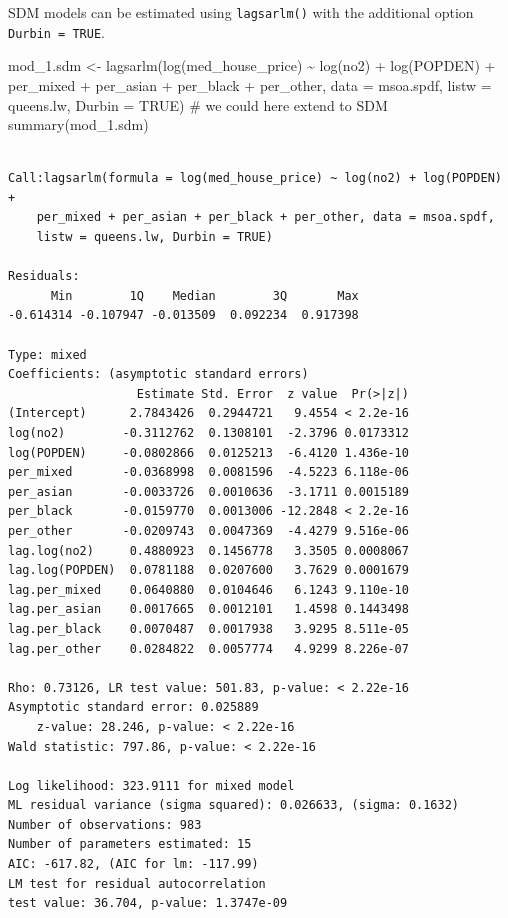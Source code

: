 \documentclass[
  letterpaper,
]{scrbook}
\newenvironment{Shaded}{\begin{snugshade}}{\end{snugshade}}
\newcommand{\AttributeTok}[1]{\textcolor[rgb]{0.40,0.45,0.13}{#1}}
\newcommand{\CommentTok}[1]{\textcolor[rgb]{0.37,0.37,0.37}{#1}}
\newcommand{\ConstantTok}[1]{\textcolor[rgb]{0.56,0.35,0.01}{#1}}
\newcommand{\FunctionTok}[1]{\textcolor[rgb]{0.28,0.35,0.67}{#1}}
\newcommand{\NormalTok}[1]{\textcolor[rgb]{0.00,0.23,0.31}{#1}}
\newcommand{\OtherTok}[1]{\textcolor[rgb]{0.00,0.23,0.31}{#1}}
\newcommand{\SpecialCharTok}[1]{\textcolor[rgb]{0.37,0.37,0.37}{#1}}
\begin{document}
SDM models can be estimated using \texttt{lagsarlm()} with the
additional option \texttt{Durbin\ =\ TRUE}.

\begin{Shaded}
\begin{Highlighting}[]
\NormalTok{mod\_1.sdm }\OtherTok{\textless{}{-}} \FunctionTok{lagsarlm}\NormalTok{(}\FunctionTok{log}\NormalTok{(med\_house\_price) }\SpecialCharTok{\textasciitilde{}} \FunctionTok{log}\NormalTok{(no2) }\SpecialCharTok{+} \FunctionTok{log}\NormalTok{(POPDEN) }\SpecialCharTok{+} 
\NormalTok{                        per\_mixed }\SpecialCharTok{+}\NormalTok{ per\_asian }\SpecialCharTok{+}\NormalTok{ per\_black }\SpecialCharTok{+}\NormalTok{ per\_other,  }
                      \AttributeTok{data =}\NormalTok{ msoa.spdf, }
                      \AttributeTok{listw =}\NormalTok{ queens.lw,}
                      \AttributeTok{Durbin =} \ConstantTok{TRUE}\NormalTok{) }\CommentTok{\# we could here extend to SDM}
\FunctionTok{summary}\NormalTok{(mod\_1.sdm)}
\end{Highlighting}
\end{Shaded}

\begin{verbatim}

Call:lagsarlm(formula = log(med_house_price) ~ log(no2) + log(POPDEN) + 
    per_mixed + per_asian + per_black + per_other, data = msoa.spdf, 
    listw = queens.lw, Durbin = TRUE)

Residuals:
      Min        1Q    Median        3Q       Max 
-0.614314 -0.107947 -0.013509  0.092234  0.917398 

Type: mixed 
Coefficients: (asymptotic standard errors) 
                  Estimate Std. Error  z value  Pr(>|z|)
(Intercept)      2.7843426  0.2944721   9.4554 < 2.2e-16
log(no2)        -0.3112762  0.1308101  -2.3796 0.0173312
log(POPDEN)     -0.0802866  0.0125213  -6.4120 1.436e-10
per_mixed       -0.0368998  0.0081596  -4.5223 6.118e-06
per_asian       -0.0033726  0.0010636  -3.1711 0.0015189
per_black       -0.0159770  0.0013006 -12.2848 < 2.2e-16
per_other       -0.0209743  0.0047369  -4.4279 9.516e-06
lag.log(no2)     0.4880923  0.1456778   3.3505 0.0008067
lag.log(POPDEN)  0.0781188  0.0207600   3.7629 0.0001679
lag.per_mixed    0.0640880  0.0104646   6.1243 9.110e-10
lag.per_asian    0.0017665  0.0012101   1.4598 0.1443498
lag.per_black    0.0070487  0.0017938   3.9295 8.511e-05
lag.per_other    0.0284822  0.0057774   4.9299 8.226e-07

Rho: 0.73126, LR test value: 501.83, p-value: < 2.22e-16
Asymptotic standard error: 0.025889
    z-value: 28.246, p-value: < 2.22e-16
Wald statistic: 797.86, p-value: < 2.22e-16

Log likelihood: 323.9111 for mixed model
ML residual variance (sigma squared): 0.026633, (sigma: 0.1632)
Number of observations: 983 
Number of parameters estimated: 15 
AIC: -617.82, (AIC for lm: -117.99)
LM test for residual autocorrelation
test value: 36.704, p-value: 1.3747e-09
\end{verbatim}
\end{document}
